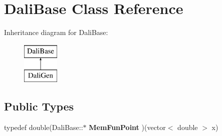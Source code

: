 \hypertarget{classDaliBase}{\section{Dali\-Base Class Reference}
\label{classDaliBase}
}
Inheritance diagram for Dali\-Base\-:\begin{figure}[H]
\begin{center}
\leavevmode
\includegraphics[height=2.000000cm]{classDaliBase}
\end{center}
\end{figure}
\subsection*{Public Types}
\begin{DoxyCompactItemize}
\item 
\hypertarget{classDaliBase_ad587f8c3da29a7e58727872d2a27eeb3}{typedef double(Dali\-Base\-::$\ast$ {\bfseries Mem\-Fun\-Point} )(vector$<$ double $>$ x)}\label{classDaliBase_ad587f8c3da29a7e58727872d2a27eeb3}

\end{DoxyCompactItemize}
